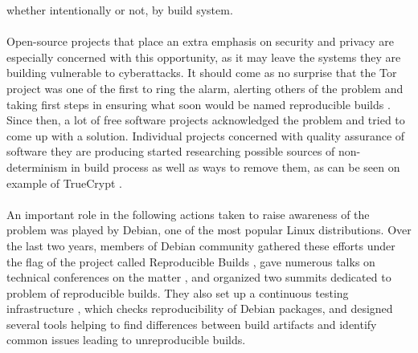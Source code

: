 {whether intentionally or not, by build system. \\\\
Open-source projects that place an extra emphasis on security
and privacy are especially concerned with this opportunity, as
it may leave the systems they are building vulnerable to cyberattacks.
It should come as no surprise that the Tor project was one of the
first to ring the alarm, alerting others of the problem and taking first steps
in ensuring what soon would be named reproducible builds \autocite{tor13, tor14}.
Since then, a lot of free software projects acknowledged the problem and
tried to come up with a solution. Individual projects concerned with quality
assurance of software they are producing started researching possible sources of
non-determinism in build process as well as ways to remove them, as can be
seen on example of TrueCrypt \autocite{de2014challenges}.\\\\
An important role in the following actions taken to raise awareness of the
problem was played by Debian, one of the most popular Linux distributions.
Over the last two years, members of Debian community gathered these efforts
under the flag of the project called Reproducible Builds \autocite{rb},
gave numerous talks on technical conferences on the matter
\autocite{Lun14, lca2017_valerie}, and organized
two summits dedicated to problem of reproducible builds. They also set up a continuous
testing infrastructure \autocite{tests-rbo}, which checks reproducibility
of Debian packages, and designed several tools helping to find
differences between build artifacts and identify common issues leading to
unreproducible builds.}
